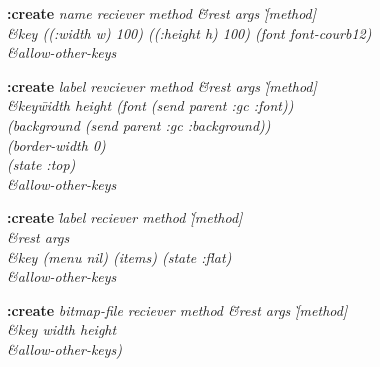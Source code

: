 {\newpage
\clearpage
\samepage 
\begin{figure}\begin{center}
\end{center}

\end{figure}
}

{\newpage
\clearpage
\samepage 
\begin{figure}\begin{center}
\end{center}

\end{figure}
}

{\newpage
\clearpage
\samepage 
\begin{emtabbing}{\bf :create} 
\it name reciever method \= \&rest args
\` [method] \\  
\> \&key ((:width w) 100) ((:height h) 100) (font font-courb12)\\  
\> \&allow-other-keys
\rm
\end{emtabbing}
}

{\newpage
\clearpage
\samepage 
\begin{emtabbing}{\bf :create} 
\it label revciever method \= \&rest args
\` [method]\\  
\>\&key\= width height (font (send parent :gc :font))\\  
\>\> (background (send parent :gc :background)) \\  
\>\> (border-width 0) \\  
\>\> (state :top)\\  
\>\&allow-other-keys
\rm
\end{emtabbing}
}

{\newpage
\clearpage
\samepage 
\begin{emtabbing}{\bf :create} 
\it \= label reciever method \` [method]\\  
\>\&rest args\\  
\>\&key (menu nil) (items) (state :flat)\\  
\>\&allow-other-keys
\rm
\end{emtabbing}
}

{\newpage
\clearpage
\samepage 
\begin{emtabbing}{\bf :create} 
\it  bitmap-file reciever method \= \&rest args
\` [method]\\  
                 \>\&key width height\\  
                 \>\&allow-other-keys)

\rm
\end{emtabbing}
}

